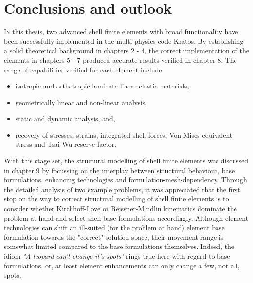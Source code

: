 
\chapter{Conclusions and outlook}
\label{chap:conclusions}
\renewcommand{\Thema}{Conclusion}

\lettrine[lines=2]{I}{n} this thesis, two advanced shell finite elements with broad functionality have been successfully implemented in the multi-physics code Kratos. By establishing a solid theoretical background in chapters 2 - 4, the correct implementation of the elements in chapters 5 - 7 produced accurate results verified in chapter 8. The range of  capabilities verified for each element include:
\begin{itemize}
	\item isotropic and orthotropic laminate linear elastic materials,
	\item geometrically linear and non-linear analysis,
	\item static and dynamic analysis, and,
	\item recovery of stresses, strains, integrated shell forces, Von Mises equivalent stress and Tsai-Wu reserve factor.
\end{itemize}

With this stage set, the structural modelling of shell finite elements was discussed in chapter 9 by focussing on the interplay between structural behaviour, base formulations, enhancing technologies and formulation-mesh-dependency. Through the detailed analysis of two example problems, it was appreciated that the first stop on the way to correct structural modelling of shell finite elements is to consider whether Kirchhoff-Love or Reissner-Mindlin kinematics dominate the problem at hand and select shell base formulations accordingly. Although element technologies can shift an ill-suited (for the problem at hand) element base formulation towards the "correct" solution space, their movement range is somewhat limited compared to the base formulations themselves. Indeed, the idiom \textit{"A leopard can't change it's spots"} rings true here with regard to base formulations, or, at least element enhancements can only change a few, not all, spots. 

